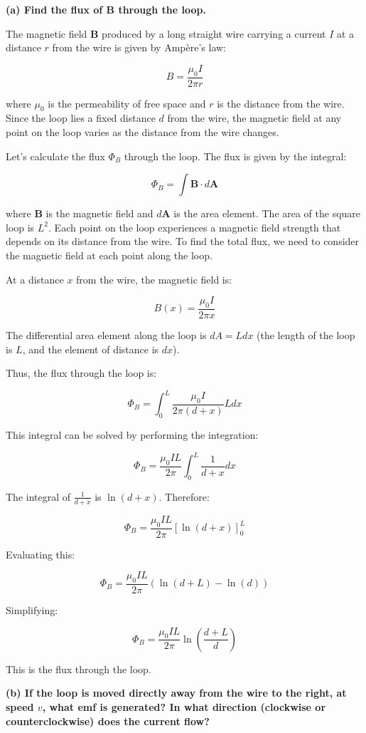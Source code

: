 \textbf{(a) Find the flux of $\mathbf{B}$ through the loop.}

The magnetic field $\mathbf{B}$ produced by a long straight wire carrying a current $I$ at a distance $r$ from the wire is given by Ampère's law:

\[
B = \frac{\mu_0 I}{2 \pi r}
\]

where $\mu_0$ is the permeability of free space and $r$ is the distance from the wire. Since the loop lies a fixed distance $d$ from the wire, the magnetic field at any point on the loop varies as the distance from the wire changes.

Let’s calculate the flux $\Phi_B$ through the loop. The flux is given by the integral:

\[
\Phi_B = \int \mathbf{B} \cdot d\mathbf{A}
\]

where $\mathbf{B}$ is the magnetic field and $d\mathbf{A}$ is the area element. The area of the square loop is $L^2$. Each point on the loop experiences a magnetic field strength that depends on its distance from the wire. To find the total flux, we need to consider the magnetic field at each point along the loop.

At a distance $x$ from the wire, the magnetic field is:

\[
B(x) = \frac{\mu_0 I}{2 \pi x}
\]

The differential area element along the loop is $dA = L dx$ (the length of the loop is $L$, and the element of distance is $dx$).

Thus, the flux through the loop is:

\[
\Phi_B = \int_0^L \frac{\mu_0 I}{2 \pi (d + x)} L dx
\]

This integral can be solved by performing the integration:

\[
\Phi_B = \frac{\mu_0 I L}{2 \pi} \int_0^L \frac{1}{d + x} dx
\]

The integral of $\frac{1}{d + x}$ is $\ln(d + x)$. Therefore:

\[
\Phi_B = \frac{\mu_0 I L}{2 \pi} \left[ \ln(d + x) \right]_0^L
\]

Evaluating this:

\[
\Phi_B = \frac{\mu_0 I L}{2 \pi} \left( \ln(d + L) - \ln(d) \right)
\]

Simplifying:

\[
\Phi_B = \frac{\mu_0 I L}{2 \pi} \ln\left( \frac{d + L}{d} \right)
\]

This is the flux through the loop.

\textbf{(b) If the loop is moved directly away from the wire to the right, at speed $v$, what emf is generated? In what direction (clockwise or counterclockwise) does the current flow?}

